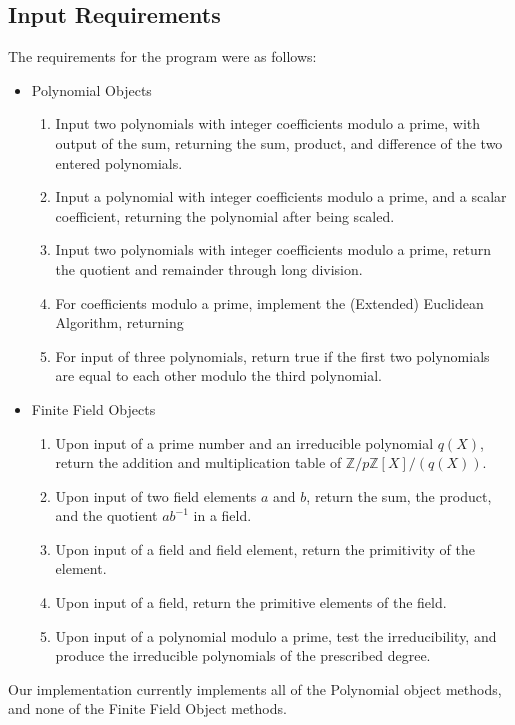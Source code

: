 \documentclass[
10pt, %
a4paper, %
oneside, %
headinclude,footinclude, %
BCOR5mm, %
]{scrartcl}
\begin{document}
\subsection{Input Requirements}
The requirements for the program were as follows:
\begin{itemize}


\item Polynomial Objects
	\begin{enumerate}[noitemsep]
	\item Input two polynomials with integer coefficients modulo a prime, with output of the sum, returning the sum, product, and difference of the two entered polynomials.
	\item Input a polynomial with integer coefficients modulo a prime, and a scalar coefficient, returning the polynomial after being scaled.
	\item Input two polynomials with integer coefficients modulo a prime, return the quotient and remainder through long division.
	\item For coefficients modulo a prime, implement the (Extended) Euclidean Algorithm, returning 
	\item For input of three polynomials, return true if the first two polynomials are equal to each other modulo the third polynomial.
	\end{enumerate}

\item Finite Field Objects
	\begin{enumerate}[noitemsep]
	\item Upon input of a prime number and an irreducible polynomial $q(X)$, return the addition and multiplication table of $\mathbb{Z}/p\mathbb{Z}[X]/(q(X))$.
	\item Upon input of two field elements $a$ and $b$, return the sum, the product, and the quotient $ab^{-1}$ in a field.
	\item Upon input of a field and field element, return the primitivity of the element.
	\item Upon input of a field, return the primitive elements of the field.
	\item Upon input of a polynomial modulo a prime, test the irreducibility, and produce the irreducible polynomials of the prescribed degree. 
	\end{enumerate}
\end{itemize}

Our implementation currently implements all of the Polynomial object methods, and none of the Finite Field Object methods.
\end{document}
